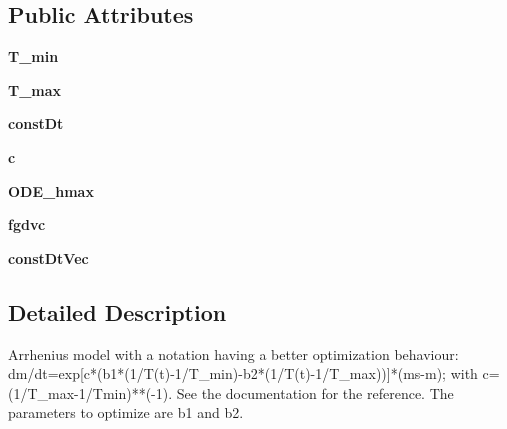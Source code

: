 \subsection*{\-Public \-Attributes}
\begin{DoxyCompactItemize}
\item 
\hypertarget{classModels_1_1ArrheniusModelAlternativeNotation2_af34ea99cbe467aea419df689f3ad2d1a}{{\bfseries \-T\-\_\-min}}\label{classModels_1_1ArrheniusModelAlternativeNotation2_af34ea99cbe467aea419df689f3ad2d1a}

\item 
\hypertarget{classModels_1_1ArrheniusModelAlternativeNotation2_a43499e47431b8f8a00ac3d911d59d889}{{\bfseries \-T\-\_\-max}}\label{classModels_1_1ArrheniusModelAlternativeNotation2_a43499e47431b8f8a00ac3d911d59d889}

\item 
\hypertarget{classModels_1_1ArrheniusModelAlternativeNotation2_a226c031ab761b1c46b2dc0a6718eb340}{{\bfseries const\-Dt}}\label{classModels_1_1ArrheniusModelAlternativeNotation2_a226c031ab761b1c46b2dc0a6718eb340}

\item 
\hypertarget{classModels_1_1ArrheniusModelAlternativeNotation2_a820391809a51812c06ece08248ce30fe}{{\bfseries c}}\label{classModels_1_1ArrheniusModelAlternativeNotation2_a820391809a51812c06ece08248ce30fe}

\item 
\hypertarget{classModels_1_1ArrheniusModelAlternativeNotation2_ada7f810b2f91a9c1454545a058c0e560}{{\bfseries \-O\-D\-E\-\_\-hmax}}\label{classModels_1_1ArrheniusModelAlternativeNotation2_ada7f810b2f91a9c1454545a058c0e560}

\item 
\hypertarget{classModels_1_1ArrheniusModelAlternativeNotation2_a4d09873028a6c0bc11fe0a05016604cc}{{\bfseries fgdvc}}\label{classModels_1_1ArrheniusModelAlternativeNotation2_a4d09873028a6c0bc11fe0a05016604cc}

\item 
\hypertarget{classModels_1_1Model_a3f71983de5f8b86bec47929213b900ec}{{\bfseries const\-Dt\-Vec}}\label{classModels_1_1Model_a3f71983de5f8b86bec47929213b900ec}

\end{DoxyCompactItemize}


\subsection{\-Detailed \-Description}
\begin{DoxyVerb}Arrhenius model with a notation having a better optimization behaviour: dm/dt=exp[c*(b1*(1/T(t)-1/T_min)-b2*(1/T(t)-1/T_max))]*(ms-m); with c=(1/T_max-1/Tmin)**(-1). See the documentation for the reference. The parameters to optimize are b1 and b2.\end{DoxyVerb}
 


